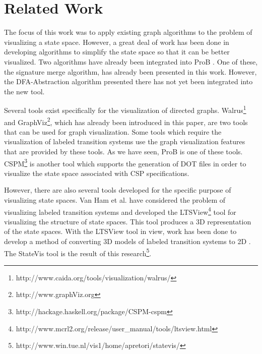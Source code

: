 \section{Related Work}

The focus of this work was to apply existing graph algorithms to the problem of visualizing a state space. However, a great deal of work has been done in developing algorithms to simplify the state space so that it can be better visualized. Two algorithms have already been integrated into ProB \cite{LeTu05_8}. One of these, the signature merge algorithm, has already been presented in this work. However, the DFA-Abstraction algorithm presented there has not yet been integrated into the new tool.

Several tools exist specifically for the visualization of directed graphs. Walrus\footnote{http://www.caida.org/tools/visualization/walrus/} and GraphViz\footnote{http://www.graphViz.org}, which has already been introduced in this paper, are two tools that can be used for graph visualization. Some tools which require the visualization of labeled transition systems use the graph visualization features that are provided by these tools. As we have seen, ProB is one of these tools. CSPM\footnote{http://hackage.haskell.org/package/CSPM-cspm} is another tool which supports the generation of DOT files in order to visualize the state space associated with CSP specifications.

However, there are also several tools developed for the specific purpose of visualizing state spaces. Van Ham et al. \cite{Ham02} have considered the problem of visualizing labeled transition systems and developed the LTSView\footnote{http://www.mcrl2.org/release/user\_manual/tools/ltsview.html} tool for visualizing the structure of state spaces. This tool produces a 3D representation of the state spaces. With the LTSView tool in view, work has been done to develop a method of converting 3D models of labeled transition systems to 2D \cite{Pretorius2005}. The StateVis tool is the result of this research\footnote{http://www.win.tue.nl/vis1/home/apretori/statevis/}.
